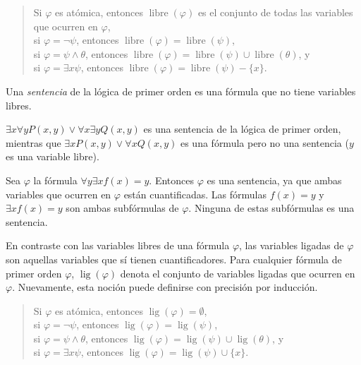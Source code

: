\message{ !name(main.tex)}\documentclass[12pt,a4paper]{book}
\DeclareMathOperator{\libre}{libre}
\DeclareMathOperator{\lig}{lig}
\begin{document}
    \begin{quote}
        Si $\varphi$ es atómica, entonces $\libre(\varphi)$ es el conjunto de todas las variables que ocurren en $\varphi$,\\
        si $\varphi=\neg\psi$, entonces $\libre(\varphi)=\libre(\psi)$,\\
        si $\varphi=\psi\wedge\theta$, entonces $\libre(\varphi)=\libre(\psi)\cup\libre(\theta)$, y\\
        si $\varphi=\exists x\psi$, entonces $\libre(\varphi)=\libre(\psi)-\{x\}$.
    \end{quote}

    \begin{definicion}[Sentencia]\label{def:sentencia}
        Una \textit{sentencia} de la lógica de primer orden es una fórmula que no tiene variables libres.
    \end{definicion}

    \begin{ejemplo}
        $\exists x\forall yP(x,y)\vee\forall x\exists yQ(x,y)$ es una sentencia de la lógica de primer orden, mientras que
        $\exists xP(x,y)\vee\forall xQ(x,y)$ es una fórmula pero no una sentencia ($y$ es una variable libre).
    \end{ejemplo}

    \begin{ejemplo}
        Sea $\varphi$ la fórmula $\forall y\exists xf(x)=y$. Entonces $\varphi$ es una sentencia, ya que ambas variables que
        ocurren en $\varphi$ están cuantificadas. Las fórmulas $f(x)=y$ y $\exists xf(x)=y$ son ambas subfórmulas de
        $\varphi$. Ninguna de estas subfórmulas es una sentencia.
    \end{ejemplo}

    En contraste con las variables libres de una fórmula $\varphi$, las variables ligadas de $\varphi$ son aquellas
    variables que sí tienen cuantificadores. Para cualquier fórmula de primer orden $\varphi$, $\lig(\varphi)$ denota el
    conjunto de variables ligadas que ocurren en $\varphi$. Nuevamente, esta noción puede definirse con precisión por
    inducción.

    \begin{quote}
        Si $\varphi$ es atómica, entonces $\lig(\varphi)=\emptyset$,\\
        si $\varphi=\neg\psi$, entonces $\lig(\varphi)=\lig(\psi)$,\\
        si $\varphi=\psi\wedge\theta$, entonces $\lig(\varphi)=\lig(\psi)\cup\lig(\theta)$, y\\
        si $\varphi=\exists x\psi$, entonces $\lig(\varphi)=\lig(\psi)\cup\{x\}$.
    \end{quote}
\end{document}
